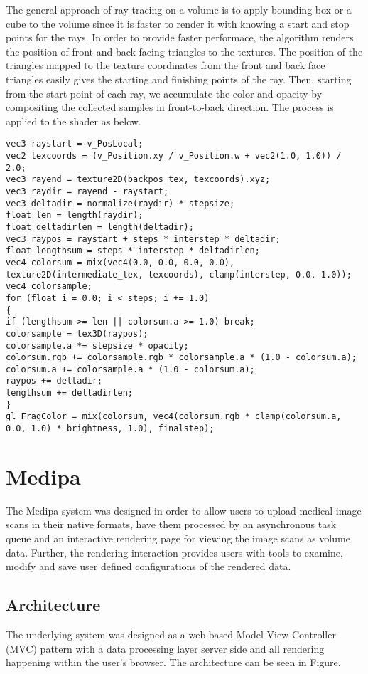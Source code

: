 \documentclass{acm_proc_article-sp}
\begin{document}
The general approach of ray tracing on a volume is to apply bounding box or a cube to the volume since it is faster to render it with knowing a start and stop points for the rays. In order to provide faster performace, the algorithm renders the position of front and back facing triangles to the textures. The position of the triangles mapped to the texture coordinates from the front and back face triangles easily gives the starting and finishing points of the ray. Then, starting from the start point of each ray, we accumulate the color and opacity by compositing the collected samples in front-to-back direction. The process is applied to the shader as below.

\begin{verbatim}
vec3 raystart = v_PosLocal;
vec2 texcoords = (v_Position.xy / v_Position.w + vec2(1.0, 1.0)) / 2.0;
vec3 rayend = texture2D(backpos_tex, texcoords).xyz;
vec3 raydir = rayend - raystart;
vec3 deltadir = normalize(raydir) * stepsize;
float len = length(raydir);
float deltadirlen = length(deltadir);
vec3 raypos = raystart + steps * interstep * deltadir;
float lengthsum = steps * interstep * deltadirlen;
vec4 colorsum = mix(vec4(0.0, 0.0, 0.0, 0.0), texture2D(intermediate_tex, texcoords), clamp(interstep, 0.0, 1.0));
vec4 colorsample;
for (float i = 0.0; i < steps; i += 1.0)
{
if (lengthsum >= len || colorsum.a >= 1.0) break;
colorsample = tex3D(raypos);
colorsample.a *= stepsize * opacity;
colorsum.rgb += colorsample.rgb * colorsample.a * (1.0 - colorsum.a);
colorsum.a += colorsample.a * (1.0 - colorsum.a);
raypos += deltadir;
lengthsum += deltadirlen;
}
gl_FragColor = mix(colorsum, vec4(colorsum.rgb * clamp(colorsum.a, 0.0, 1.0) * brightness, 1.0), finalstep);
\end{verbatim}

\section{Medipa}
The Medipa system was designed in order to allow users to upload medical image scans in their native formats, have them processed by an asynchronous task queue and an interactive rendering page for viewing the image scans as volume data.  Further, the rendering interaction provides users with tools to examine, modify and save user defined configurations of the rendered data.

\subsection{Architecture}
The underlying system was designed as a web-based Model-View-Controller (MVC) pattern with a data processing layer server side and all rendering happening within the user's browser.  The architecture can be seen in Figure.
\end{document}
